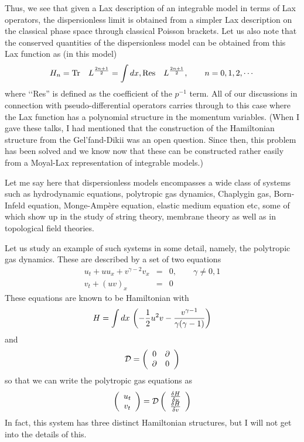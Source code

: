 \documentclass[a4paper,11pt]{article}
\begin{document}
Thus, we see that given a Lax description of an integrable model in
terms of Lax operators, the dispersionless limit is obtained from a
simpler Lax description on the classical phase space through classical
Poisson brackets. Let us also note that the conserved quantities of
the dispersionless model can be obtained from this Lax function as (in
this model)
\begin{equation}
H_{n} = {\rm Tr}\quad L^{2n+1\over 2} = \int dx, {\rm Res}\quad
L^{2n+1\over 2},\qquad n = 0,1,2,\cdots
\end{equation}
where \lq\lq Res'' is defined as the coefficient of the $p^{-1}$
term. All of our discussions in connection with pseudo-differential
operators carries through to this case where the Lax function has a
polynomial structure in the momentum variables. (When I gave these
talks, I had mentioned that the construction of the Hamiltonian
structure from the Gel'fand-Dikii was an open question. Since then,
this problem has been solved and we know now that these can be
constructed rather easily from a Moyal-Lax representation of
integrable models.)

Let me say here that dispersionless models encompasses a wide class of
systems such as hydrodynamic equations, polytropic gas dynamics,
Chaplygin gas, Born-Infeld equation, Monge-Amp\`{e}re equation,
elastic medium equation etc, some of which show up in the study of
string theory, membrane theory as well as in topological field
theories.

Let us study an example of such systems in some detail, namely, the
polytropic gas dynamics. These are described by a set of two equations
\begin{eqnarray}
u_{t} + u u_{x} + v^{\gamma -2} v_{x} & = & 0,\qquad \gamma \neq
0,1\nonumber\\
v_{t} + (u v)_{x} & = & 0
\end{eqnarray}
These equations are known to be Hamiltonian with
\begin{equation}
H = \int dx\,\left(-{1\over 2} u^{2}v - {v^{\gamma -1}\over \gamma
(\gamma -1)}\right)
\end{equation}
and
\begin{equation}
{\cal D} = \left(\begin{array}{cc}
0 & \partial\\
\partial & 0
\end{array}\right)
\end{equation}
so that we can write the polytropic gas equations as
\begin{equation}
\left(\begin{array}{c}
u_{t}\\
v_{t}
\end{array}\right) = {\cal D} \left(\begin{array}{c}
{\delta H\over \delta u}\\
{\delta H\over \delta v}
\end{array}\right)
\end{equation}
In fact, this system has three distinct Hamiltonian structures, but I
will not get into the details of this.
\end{document}
